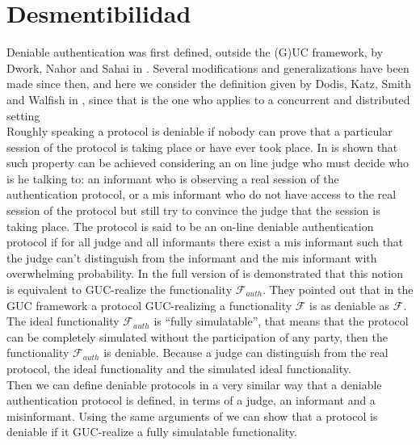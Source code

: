 \chapter{Desmentibilidad}
Deniable authentication was first defined, outside the (G)UC framework, by Dwork, Nahor and Sahai in
\cite{DwoNaoSah04}. Several modifications and generalizations have been made since then, and here we consider
the definition given by Dodis, Katz, Smith and Walfish in \cite{conf/tcc/DodisKSW09}, since that is the one who
applies to a concurrent and distributed setting\\
Roughly speaking a protocol is deniable if nobody can prove that a particular session of
the protocol is taking place or have ever took place. In \cite{conf/tcc/DodisKSW09} is shown that such property
can be achieved considering an on line judge who must decide who is he talking to: an informant who is observing
a real session of the authentication protocol, or a mis informant who do not have access to the real session of
the protocol but still try to convince the judge that the session is taking place. The protocol is said to be
an on-line deniable authentication protocol if for all judge and all informants there exist a mis informant such that
the judge can't distinguish from the informant and the mis informant with overwhelming probability. In the
full version of \cite{conf/tcc/DodisKSW09} is demonstrated that this notion is equivalent to GUC-realize the
functionality $\mathcal{F}_{auth}$. They pointed out that in the GUC framework a protocol GUC-realizing
a functionality $\mathcal{F}$ is as deniable as $\mathcal{F}$. The ideal functionality $\mathcal{F}_{auth}$ is
``fully simulatable'', that means that the protocol can be completely simulated without the participation
of any party, then the functionality $\mathcal{F}_{auth}$ is deniable. Because a judge can distinguish
from the real protocol, the ideal functionality and the simulated ideal functionality.\\
Then we can define deniable protocols in a very similar way that a deniable authentication protocol is defined,
in terms of a judge, an informant and a misinformant.
Using the same arguments of \cite{conf/tcc/DodisKSW09} we can show  that a protocol is deniable if it
GUC-realize a fully simulatable functionality.

